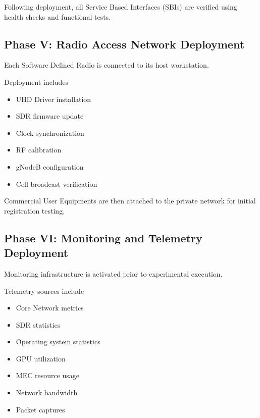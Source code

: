 \documentclass[12pt,a4paper]{article}\usepackage[a4paper,margin=1in]{geometry}\usepackage{graphicx}\usepackage{longtable}\usepackage{booktabs}\usepackage{hyperref}\usepackage{enumitem}\usepackage{amsmath}\usepackage{tikz}\usepackage{pgfgantt}\usepackage{setspace}\setstretch{1.15}\usetikzlibrary{positioning,arrows.meta,shapes.geometric}
\begin{document}
	Following deployment, all Service Based Interfaces (SBIs) are verified using health checks and functional tests.
	
	
	\subsection{Phase V: Radio Access Network Deployment}
	
	Each Software Defined Radio is connected to its host workstation.
	
	Deployment includes
	
	\begin{itemize}
		
		\item UHD Driver installation
		
		\item SDR firmware update
		
		\item Clock synchronization
		
		\item RF calibration
		
		\item gNodeB configuration
		
		\item Cell broadcast verification
		
	\end{itemize}
	
	Commercial User Equipments are then attached to the private network for initial registration testing.
	
	
	\subsection{Phase VI: Monitoring and Telemetry Deployment}
	
	Monitoring infrastructure is activated prior to experimental execution.
	
	Telemetry sources include
	
	\begin{itemize}
		
		\item Core Network metrics
		
		\item SDR statistics
		
		\item Operating system statistics
		
		\item GPU utilization
		
		\item MEC resource usage
		
		\item Network bandwidth
		
		\item Packet captures
		
	\end{itemize}
	
\end{document}
